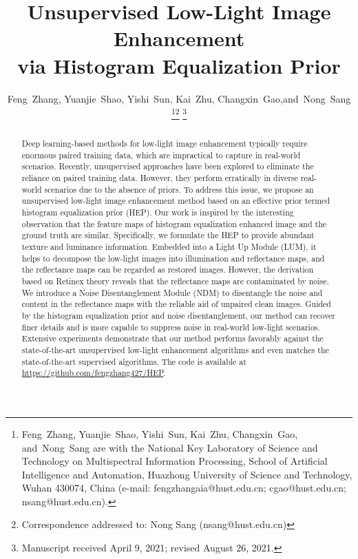\documentclass[journal]{IEEEtran}
\begin{document}
\title{Unsupervised Low-Light Image Enhancement\\
via Histogram Equalization Prior}
\author{Feng~Zhang, Yuanjie~Shao, Yishi~Sun, Kai~Zhu, Changxin~Gao,and~Nong~Sang\\


\thanks{Feng~Zhang,
        Yuanjie~Shao,
        Yishi~Sun,
        Kai~Zhu,
        Changxin~Gao,
        and~Nong~Sang are with the National Key Laboratory of Science and Technology on Multispectral Information Processing, School of Artificial Intelligence and Automation, Huazhong University of Science and Technology, Wuhan 430074, China (e-mail: fengzhangaia@hust.edu.cn; cgao@hust.edu.cn; nsang@hust.edu.cn).}\thanks{Correspondence addressed to: Nong Sang (nsang@hust.edu.cn)}
\thanks{Manuscript received April 9, 2021; revised August 26, 2021.}}


\maketitle
\begin{abstract}
Deep learning-based methods for low-light image enhancement typically require enormous paired training data, which are impractical to capture in real-world scenarios. Recently, unsupervised approaches have been explored to eliminate the reliance on paired training data. However, they perform erratically in diverse real-world scenarios due to the absence of priors. To address this issue, we propose an unsupervised low-light image enhancement method based on an effective prior termed histogram equalization prior (HEP). Our work is inspired by the interesting observation that the feature maps of histogram equalization enhanced image and the ground truth are similar. Specifically, we formulate the HEP to provide abundant texture and luminance information. Embedded into a Light Up Module (LUM), it helps to decompose the low-light images into illumination and reflectance maps, and the reflectance maps can be regarded as restored images. However, the derivation based on Retinex theory reveals that the reflectance maps are contaminated by noise. We introduce a Noise Disentanglement Module (NDM) to disentangle the noise and content in the reflectance maps with the reliable aid of unpaired clean images. Guided by the histogram equalization prior and noise disentanglement, our method can recover finer details and is more capable to suppress noise in real-world low-light scenarios. Extensive experiments demonstrate that our method performs favorably against the state-of-the-art unsupervised low-light enhancement algorithms and even matches the state-of-the-art supervised algorithms. The code is available at \url{https://github.com/fengzhang427/HEP}.
\end{abstract}
\end{document}
